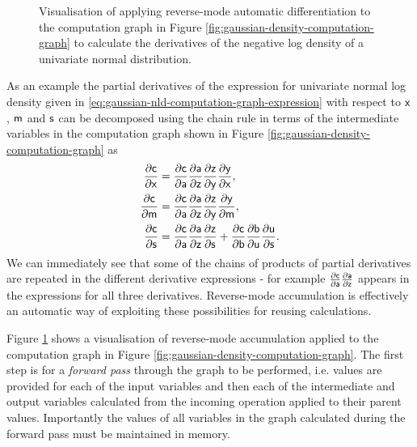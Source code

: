 \begin{figure}[!t]
\vskip 0pt
\centering
{}
\vskip 0pt
\caption[Reverse-mode automatic differentiation.]{Visualisation of applying reverse-mode automatic differentiation to the computation graph in Figure \ref{fig:gaussian-density-computation-graph} to calculate the derivatives of the negative log density of a univariate normal distribution.}
\label{fig:gaussian-density-gradient-computation-graph}
\end{figure}

As an example the partial derivatives of the expression for univariate normal log density given in \eqref{eq:gaussian-nld-computation-graph-expression} with respect to $\mathsf{x}$, $\mathsf{m}$ and $\mathsf{s}$ can be decomposed using the chain rule in terms of the intermediate variables in the computation graph shown in Figure \ref{fig:gaussian-density-computation-graph} as
\begin{align}
  \frac{\partial \mathsf{c}}{\partial \mathsf{x}} &=
  \frac{\partial \mathsf{c}}{\partial \mathsf{a}} 
  \frac{\partial \mathsf{a}}{\partial \mathsf{z}}
  \frac{\partial \mathsf{z}}{\partial \mathsf{y}}
  \frac{\partial \mathsf{y}}{\partial \mathsf{x}},
  \\
  \frac{\partial \mathsf{c}}{\partial \mathsf{m}} &=
  \frac{\partial \mathsf{c}}{\partial \mathsf{a}} 
  \frac{\partial \mathsf{a}}{\partial \mathsf{z}}
  \frac{\partial \mathsf{z}}{\partial \mathsf{y}}
  \frac{\partial \mathsf{y}}{\partial \mathsf{m}},
  \\
  \frac{\partial \mathsf{c}}{\partial \mathsf{s}} &=
  \frac{\partial \mathsf{c}}{\partial \mathsf{a}} 
  \frac{\partial \mathsf{a}}{\partial \mathsf{z}}
  \frac{\partial \mathsf{z}}{\partial \mathsf{s}} +
  \frac{\partial \mathsf{c}}{\partial \mathsf{b}} 
  \frac{\partial \mathsf{b}}{\partial \mathsf{u}}
  \frac{\partial \mathsf{u}}{\partial \mathsf{s}}.
\end{align}
We can immediately see that some of the chains of products of partial derivatives are repeated in the different derivative expressions - for example $\frac{\partial \mathsf{c}}{\partial \mathsf{a}} \frac{\partial \mathsf{a}}{\partial \mathsf{z}}$ appears in the expressions for all three derivatives. Reverse-mode accumulation is effectively an automatic way of exploiting these possibilities for reusing calculations.

Figure \ref{fig:gaussian-density-gradient-computation-graph} shows a visualisation of reverse-mode accumulation applied to the computation graph in Figure \ref{fig:gaussian-density-computation-graph}. The first step is for a \emph{forward pass} through the graph to be performed, i.e. values are provided for each of the input variables and then each of the intermediate and output variables calculated from the incoming operation applied to their parent values. Importantly the values of all variables in the graph calculated during the forward pass must be maintained in memory. 

